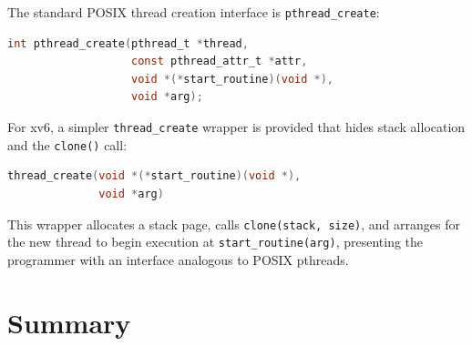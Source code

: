\documentclass[11pt]{article}
\begin{document}
The standard POSIX thread creation interface is \texttt{pthread\_create}:

\begin{lstlisting}[language=C, caption={POSIX pthread\_create interface}]
int pthread_create(pthread_t *thread,
                   const pthread_attr_t *attr,
                   void *(*start_routine)(void *),
                   void *arg);
\end{lstlisting}

For xv6, a simpler \texttt{thread\_create} wrapper is provided that hides stack allocation and the \texttt{clone()} call:

\begin{lstlisting}[language=C, caption={xv6 thread\_create interface}]
thread_create(void *(*start_routine)(void *),
              void *arg)
\end{lstlisting}

This wrapper allocates a stack page, calls \texttt{clone(stack, size)}, and arranges for the new thread to begin execution at \texttt{start\_routine(arg)}, presenting the programmer with an interface analogous to POSIX pthreads.

\section{Summary}
\end{document}
